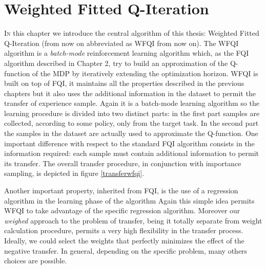 \chapter{Weighted Fitted Q-Iteration}
  \vspace{2cm}

  \lettrine[lines=2]{I}n this chapter we introduce the central algorithm of this thesis: Weighted Fitted Q-Iteration (from now on abbreviated as WFQI from now on).\newline
  The WFQI algorithm is a \textit{batch-mode} reinforcement learning algorithm which, as the FQI algorithm described in Chapter 2, try to build
  an approximation of the Q-function of the MDP by iteratively extending the optimization horizon.\newline
  WFQI is built on top of FQI, it maintains all the properties described in the previous chapters but it also uses
  the additional information in the dataset to permit the transfer of experience sample.\newline
  Again it is a batch-mode learning algorithm so the learning procedure is divided into two distinct parts: in the first part
  samples are collected, according to some policy, only from the target task. In the second part the samples in the dataset
  are actually used to approximate the Q-function.\newline
  One important difference with respect to the standard FQI algorithm consists in the information required: each sample
  must contain additional information to permit its transfer. The overall transfer procedure, in conjunction with
  importance sampling, is depicted in figure \ref{transferwfqi}.

  \noindent Another important property, inherited from FQI, is the use of a regression algorithm in the learning phase of the algorithm
  Again this simple idea permits WFQI to take advantage of the specific regression algorithm.
  Moreover our \textit{weighed} approach to the problem of transfer, being it totally separate from weight calculation procedure,
  permits a very high flexibility in the transfer process. Ideally, we could select the weights that perfectly minimizes the effect
  of the negative transfer. In general, depending on the specific problem, many others choices are possible.\newline

